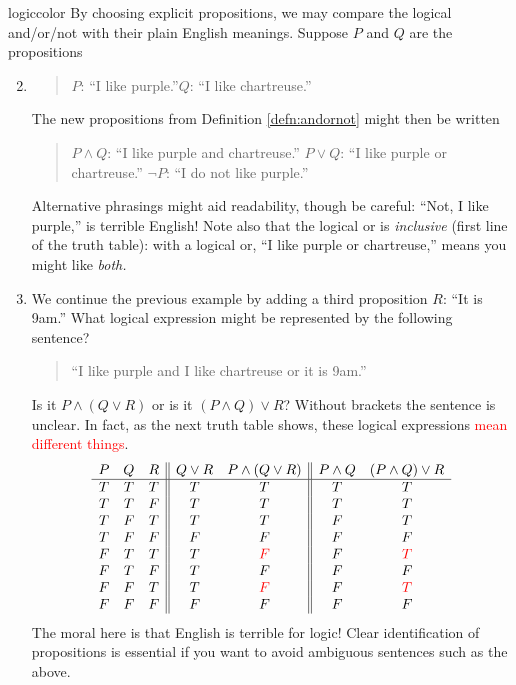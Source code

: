 \begin{examples}{}{logiccolor}
	\exstart By choosing explicit propositions, we may compare the logical and/or/not with their plain English meanings. Suppose $P$ and $Q$ are the propositions
	\begin{enumerate}\setcounter{enumi}{1}
	  \item[]\begin{quote}
		$P$: ``I like purple.''\qquad\qquad $Q$: ``I like chartreuse.''
		\end{quote}
		The new propositions from Definition \ref{defn:andornot} might then be written
		\begin{quote}
			$P\wedge Q$: ``I like purple and chartreuse.''\qquad \qquad
			$P\vee Q$: ``I like purple or chartreuse.''\medbreak
			$\neg P$: ``I do not like purple.''
		\end{quote}
		Alternative phrasings might aid readability, though be careful: ``Not, I like purple,'' is terrible English! Note also that the logical or is \emph{inclusive} (first line of the truth table): with a logical or, ``I like purple or chartreuse,'' means you might like \emph{both.}
	
		
		\item We continue the previous example by adding a third proposition $R$: ``It is 9am.''
		What logical expression might be represented by the following sentence?
		\begin{quote}
			``I like purple and I like chartreuse or it is 9am.''
		\end{quote}
		Is it $P\wedge(Q\vee R)$ or is it $(P\wedge Q)\vee R$? Without brackets the sentence is unclear. In fact, as the next truth table shows, these logical expressions \textcolor{red}{mean different things}.
		\[
			\begin{array}{ccc||cc||cc}
				P & Q & R & Q\vee R & P\wedge (Q\vee R) & P\wedge Q & (P \wedge Q)\vee R\\\hline
				T & T & T & T & T & T & T\\
				T & T & F & T & T & T & T\\
				T & F & T & T & T & F & T\\
				T & F & F & F & F & F & F\\
				F & T & T & T & \textcolor{red}{F} & F & \textcolor{red}{T}\\
				F & T & F & T & F & F & F\\
				F & F & T & T & \textcolor{red}{F} & F & \textcolor{red}{T}\\
				F & F & F & F & F & F & F
			\end{array}
		\]
		The moral here is that English is terrible for logic! Clear identification of propositions is essential if you want to avoid ambiguous sentences such as the above.
		

\end{enumerate}
\end{examples}
